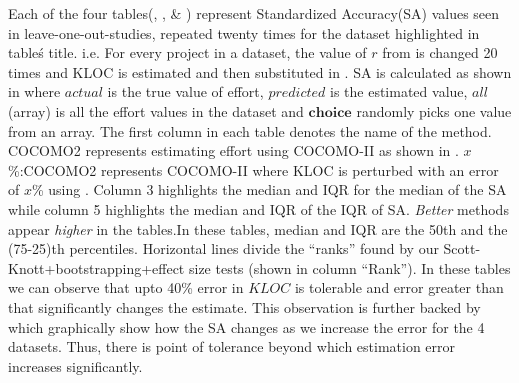 Each of the four tables(, ,  \& ) represent Standardized Accuracy(SA) values seen in leave-one-out-studies, repeated twenty times for the dataset highlighted in table\'s title. i.e. For every project in a dataset, the value of $r$ from  is changed 20 times and KLOC is estimated and then substituted in . SA is calculated as shown in  where $actual$ is the true value of effort, $predicted$ is the estimated value, $all$(array) is all the effort values in the dataset and $\pmb{choice}$ randomly picks one value from an array.  The first column in each table denotes the name of the method. COCOMO2 represents estimating effort using COCOMO-II as shown in . $x$\%:COCOMO2 represents COCOMO-II where KLOC is perturbed with an error of $x$\% using . Column 3 highlights the median and IQR for the median of the SA while column 5 highlights the median and IQR of the IQR of SA.  {\em Better} methods appear {\em higher} in the tables.In these tables, median and IQR are the 50th and the  (75-25)th percentiles. Horizontal lines divide the ``ranks'' found by our Scott-Knott+bootstrapping+effect size tests (shown in column ``Rank''). In these tables we can observe that upto 40\% error in $KLOC$ is tolerable and error greater than that significantly changes the estimate. This observation is further backed by  which graphically show how the SA changes as we increase the error for the 4 datasets. Thus, there is point of tolerance beyond which estimation error increases significantly.